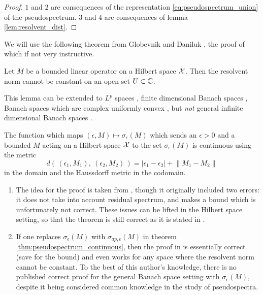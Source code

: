 \begin{proof}
    $1$ and $2$ are consequences of the representation \ref{eq:pseudospectrum_union} of 
    the pseudospectrum. $3$ and $4$ are consequences of lemma \ref{lem:resolvent_dist}. 
\end{proof}

We will use the following theorem from Globevnik \cite{globevnik} and Daniluk 
\cite{daniluk}, the proof of which if not very instructive. 

\begin{lemma}
    \label{lem:resolvent_norm_nonconst}
    Let $M$ be a bounded linear operator on a Hilbert space $\mathcal{X}$. 
    Then the resolvent norm cannot be constant on an open set $U \subset \mathbb{C}$. 
\end{lemma}

This lemma can be extended to $L^p$ spaces \cite{wienerhopf}, finite dimensional 
Banach spaces \cite{Harrabi}, Banach spaces which are complex uniformly convex 
\cite{globevnik}, but \emph{not} general infinite dimensional Banach spaces 
\cite{Shargorodsky}. 

\begin{theorem}
    \label{thm:pseudospectrum_continuous}
    The function which maps $(\epsilon, M) \mapsto \sigma_\epsilon (M)$ which sends an 
    $\epsilon > 0$ and a bounded $M$ acting on a Hilbert space $\mathcal{X}$ to the set 
    $\sigma_\epsilon (M)$ is continuous using the metric 
    \begin{equation}
        d(\, (\epsilon_1, M_1),\ (\epsilon_2, M_2) \,) 
        = | \epsilon_1 - \epsilon_2 | + \left\| M_1 - M_2 \right\|
    \end{equation}
    in the domain and the Haussdorff metric in the codomain. 
\end{theorem}

\begin{remark}
    \begin{enumerate}
        \item The idea for the proof is taken from
        \cite{pseudospectrum_continuous}, though it originally included two
        errors: it does not take into account residual spectrum, and makes a
        bound which is unfortunately not correct. These issues can be lifted in
        the Hilbert space setting, so that the theorem is still correct as it is
        stated in \cite{pseudospectrum_continuous}. 
        \item If one replaces $\sigma_\epsilon (M)$ with $\sigma_{ap, \epsilon}
        (M)$ in theorem \ref{thm:pseudospectrum_continuous}, then the proof in
        \cite{pseudospectrum_continuous} is essentially correct (save for the 
        bound) and even works for any space where the resolvent norm cannot be 
        constant. To the best of this author's knowledge, there is no
        published correct proof for the general Banach space setting with 
        $\sigma_\epsilon (M)$, despite it being
        considered common knowledge in the study of pseudospectra. 
    \end{enumerate}
\end{remark}

